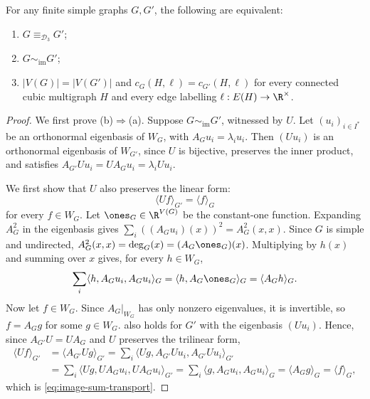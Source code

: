 \begin{lemma}\label{lem:characterisation}
 For any finite simple graphs $G,G'$, the following are equivalent:
 \begin{enumerate}
 \item[(a)] $G\equiv_{\mathcal D_3}G'$;
 \item[(b)] $G\sim_{\mathrm{im}}G'$;
 \item[(c)] $|V(G)|=|V(G')|$ and $c_G(H,\ell)=c_{G'}(H,\ell)$ for every
 connected cubic multigraph $H$ and every edge labelling
 $\ell:E(H)\to\R^\times$.
 \end{enumerate}
\end{lemma}
\begin{proof}
We first prove (b)$\Rightarrow$(a).
Suppose $G\sim_{\mathrm{im}}G'$, witnessed by $U$.
Let $(u_i)_{i\in I^*}$ be an orthonormal eigenbasis of $W_G$, with
$A_Gu_i=\lambda_i u_i$. Then $(Uu_i)$ is an orthonormal eigenbasis of
$W_{G'}$, since $U$ is bijective, preserves the inner product, and
satisfies $A_{G'}Uu_i=UA_Gu_i=\lambda_i Uu_i$.

We first show that $U$ also preserves the linear form:
\begin{equation}\label{eq:image-sum-transport}
 \langle Uf\rangle_{G'}=\langle f\rangle_G
\end{equation}
for every $f\in W_G$.
Let $\ones_G\in\R^{V(G)}$ be the constant-one function.
Expanding $A_G^2$ in the eigenbasis gives
$\sum_i ((A_Gu_i)(x))^2=A_G^2(x,x)$.
Since $G$ is simple and undirected,
$A_G^2(x,x)=\deg_G(x)=(A_G\ones_G)(x)$.
Multiplying by $h(x)$ and summing over $x$ gives, for every $h\in W_G$,
\begin{equation}\label{eq:image-linear}
 \sum_i\langle h,A_Gu_i,A_Gu_i\rangle_G
 =\langle h,A_G\ones_G\rangle_G
 =\langle A_Gh\rangle_G.
\end{equation}
Now let $f\in W_G$. Since $A_G|_{W_G}$ has only nonzero eigenvalues,
it is invertible, so $f=A_Gg$ for some $g\in W_G$.
 also holds for $G'$ with the eigenbasis
$(Uu_i)$. Hence, since $A_{G'}U=UA_G$ and $U$ preserves the trilinear
form,
\begin{equation}\label{eq:commentary-linear-transport}
 \begin{aligned}
 \langle Uf\rangle_{G'}
 &=\langle A_{G'}Ug\rangle_{G'}
 =\sum_i\langle Ug,A_{G'}Uu_i,A_{G'}Uu_i\rangle_{G'}\\
 &=\sum_i\langle Ug,UA_Gu_i,UA_Gu_i\rangle_{G'}
 =\sum_i\langle g,A_Gu_i,A_Gu_i\rangle_G
 =\langle A_Gg\rangle_G
 =\langle f\rangle_G,
 \end{aligned}
\end{equation}
which is \cref{eq:image-sum-transport}.


\end{proof}
